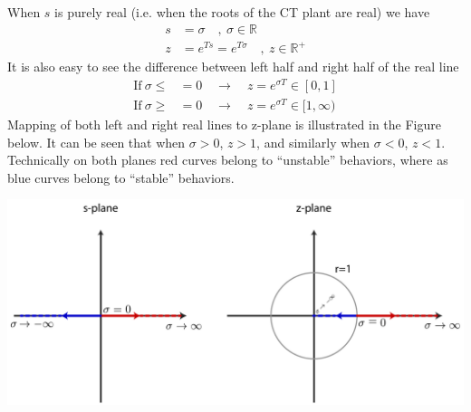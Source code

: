 \documentclass[twoside]{article}
\begin{document}
When $s$ is purely real (i.e. when the roots of the CT plant
are real) we have
\begin{align*}
s &= \sigma \quad , \ \sigma \in \mathbb{R} \\
z &= e^{Ts} = e^{T \sigma} \quad , \ z \in \mathbb{R}^+
\end{align*}
%
It is also easy to see the difference between left half and right half
of the real line 
\begin{align*}
\mathrm{If} \ \sigma \leq &= 0 \quad \rightarrow \quad z = e^{\sigma T}
  \in [0,1] \\
\mathrm{If} \ \sigma \geq &= 0 \quad \rightarrow \quad z = e^{\sigma T}
  \in [1,\infty)
\end{align*}
%
Mapping of both left and right real lines to z-plane is illustrated in
the Figure below. It can be seen that when $\sigma > 0$, $z > 1$, and 
similarly when $\sigma < 0$, $z < 1$. Technically on both planes
red curves belong to ``unstable'' behaviors, where as blue curves belong 
to ``stable'' behaviors.
%
    \begin{center}
\begin{minipage}[h]{0.75\linewidth}
    \begin{center}
      \includegraphics[width=\textwidth]{real}
    \end{center}
\end{minipage}
    \end{center}
%
\end{document}
